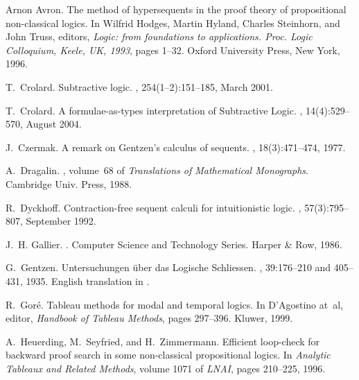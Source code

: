 \documentclass{llncs}
\numberwithin{equation}{section}
\begin{document}
\begin{thebibliography}{10}

Arnon Avron.
\newblock The method of hypersequents in the proof theory of propositional
  non-classical logics.
\newblock In Wilfrid Hodges, Martin Hyland, Charles Steinhorn, and John Truss,
  editors, {\em Logic: from foundations to applications. Proc. Logic
  Colloquium, Keele, UK, 1993}, pages 1--32. Oxford University Press, New York,
  1996.

T.~Crolard.
\newblock Subtractive logic.
, 254(1--2):151--185, March 2001.

T.~Crolard.
\newblock A formulae-as-types interpretation of {S}ubtractive {L}ogic.
, 14(4):529--570, August 2004.

J.~Czermak.
\newblock A remark on {G}entzen's calculus of sequents.
, 18(3):471--474, 1977.

A.~Dragalin.
,
  volume~68 of {\em Translations of Mathematical Monographs}.
\newblock Cambridge Univ. Press, 1988.

R.~Dyckhoff.
\newblock Contraction-free sequent calculi for intuitionistic logic.
, 57(3):795--807, September 1992.

J.~H. Gallier.
.
\newblock Computer Science and Technology Series. Harper \& Row, 1986.

G.~Gentzen.
\newblock Untersuchungen {\"u}ber das {L}ogische {S}chliessen.
, 39:176--210 and 405--431, 1935.
\newblock English translation in \cite{szabo1969}.

R.~Gor\'e.
\newblock Tableau methods for modal and temporal logics.
\newblock In D'Agostino at~al, editor, {\em Handbook of Tableau Methods}, pages
  297--396. Kluwer, 1999.

A.~Heuerding, M.~Seyfried, and H.~Zimmermann.
\newblock Efficient loop-check for backward proof search in some non-classical
  propositional logics.
\newblock In {\em Analytic Tableaux and Related Methods}, volume 1071 of {\em
  LNAI}, pages 210--225, 1996.


\end{thebibliography}
\end{document}
